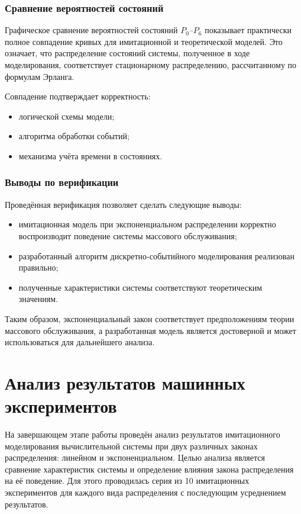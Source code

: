 \documentclass[14pt,a4paper]{extarticle}
\begin{document}
\subsubsection*{Сравнение вероятностей состояний}

Графическое сравнение вероятностей состояний $P_0$--$P_6$ показывает
практически полное совпадение кривых для имитационной и теоретической моделей.
Это означает, что распределение состояний системы, полученное в ходе
моделирования, соответствует стационарному распределению, рассчитанному по
формулам Эрланга.

Совпадение подтверждает корректность:
\begin{itemize}
  \item логической схемы модели;
  \item алгоритма обработки событий;
  \item механизма учёта времени в состояниях.
\end{itemize}

\subsubsection*{Выводы по верификации}

Проведённая верификация позволяет сделать следующие выводы:
\begin{itemize}
  \item имитационная модель при экспоненциальном распределении корректно
        воспроизводит поведение системы массового обслуживания;
  \item разработанный алгоритм дискретно-событийного моделирования реализован
        правильно;
  \item полученные характеристики системы соответствуют теоретическим значениям.
\end{itemize}

Таким образом, экспоненциальный закон соответствует предположениям теории
массового обслуживания, а разработанная модель является достоверной и может
использоваться для дальнейшего анализа.

\newpage
\section{Анализ результатов машинных экспериментов}

На завершающем этапе работы проведён анализ результатов имитационного
моделирования вычислительной системы при двух различных законах распределения:
линейном и экспоненциальном. Целью анализа является сравнение характеристик
системы и определение влияния закона распределения на её поведение. Для этого
проводилась серия из 10 имитационных экспериментов для каждого вида распределения
с последующим усреднением результатов.
\end{document}
